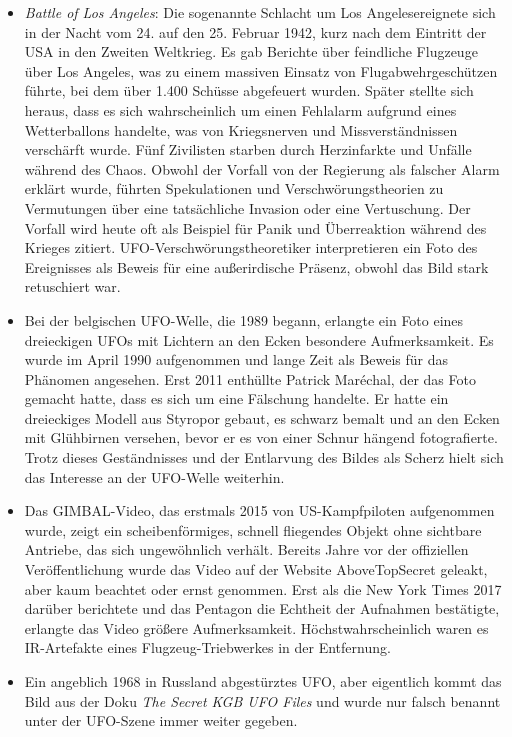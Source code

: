 \documentclass{scrartcl}
\begin{document}
\begin{itemize}
	\item \textit{Battle of Los Angeles}: Die sogenannte \frq Schlacht um Los Angeles\flq ereignete sich in der Nacht vom 24. auf den 25. Februar 1942, kurz nach dem Eintritt der USA in den Zweiten Weltkrieg. Es gab Berichte über feindliche Flugzeuge über Los Angeles, was zu einem massiven Einsatz von Flugabwehrgeschützen führte, bei dem über 1.400 Schüsse abgefeuert wurden. Später stellte sich heraus, dass es sich wahrscheinlich um einen Fehlalarm aufgrund eines Wetterballons handelte, was von Kriegsnerven und Missverständnissen verschärft wurde. Fünf Zivilisten starben durch Herzinfarkte und Unfälle während des Chaos. Obwohl der Vorfall von der Regierung als falscher Alarm erklärt wurde, führten Spekulationen und Verschwörungstheorien zu Vermutungen über eine tatsächliche Invasion oder eine Vertuschung. Der Vorfall wird heute oft als Beispiel für Panik und Überreaktion während des Krieges zitiert. UFO-Verschwörungstheoretiker interpretieren ein Foto des Ereignisses als Beweis für eine außerirdische Präsenz, obwohl das Bild stark retuschiert war. 
	\item Bei der belgischen UFO-Welle, die 1989 begann, erlangte ein Foto eines dreieckigen UFOs mit Lichtern an den Ecken besondere Aufmerksamkeit. Es wurde im April 1990 aufgenommen und lange Zeit als Beweis für das Phänomen angesehen. Erst 2011 enthüllte Patrick Maréchal, der das Foto gemacht hatte, dass es sich um eine Fälschung handelte. Er hatte ein dreieckiges Modell aus Styropor gebaut, es schwarz bemalt und an den Ecken mit Glühbirnen versehen, bevor er es von einer Schnur hängend fotografierte. Trotz dieses Geständnisses und der Entlarvung des Bildes als Scherz hielt sich das Interesse an der UFO-Welle weiterhin. 
	\item Das \frq GIMBAL\flq-Video, das erstmals 2015 von US-Kampfpiloten aufgenommen wurde, zeigt ein scheibenförmiges, schnell fliegendes Objekt ohne sichtbare Antriebe, das sich ungewöhnlich verhält. Bereits Jahre vor der offiziellen Veröffentlichung wurde das Video auf der Website AboveTopSecret geleakt, aber kaum beachtet oder ernst genommen. Erst als die New York Times 2017 darüber berichtete und das Pentagon die Echtheit der Aufnahmen bestätigte, erlangte das Video größere Aufmerksamkeit. Höchstwahrscheinlich waren es IR-Artefakte eines Flugzeug-Triebwerkes in der Entfernung.

	\item Ein angeblich 1968 in Russland abgestürztes UFO, aber eigentlich kommt das Bild aus der Doku \textit{The Secret KGB UFO Files} und wurde nur falsch benannt unter der UFO-Szene immer weiter gegeben.

\end{itemize}
\end{document}
